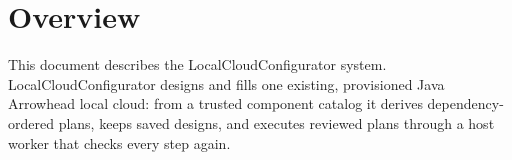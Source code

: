 \documentclass[a4paper]{arrowhead}
\begin{document}
\sloppy

\ArrowheadSetup

\begin{center}
  \vspace*{1cm}
  \huge{\arrowtitle}

  \vspace*{0.2cm}
  \LARGE{\arrowtype}
  \vspace*{1cm}

  \vspace*{\fill}


  \vspace*{1cm}
  \vspace*{\fill}

  \begin{abstract}
    This document describes the LocalCloudConfigurator support system of the Eclipse Arrowhead 5.2.2 framework, as implemented in \texttt{ah5-LocalCloudConfigurator-java} of the primary Java source tree (\texttt{Eclipse-Arrowhead-java}, Java-Spring with the vendored Eclipse Arrowhead common library) and deployed with the standalone Compose definition of that folder.
  \end{abstract}

  \vspace*{1cm}
\end{center}

\newpage

\tableofcontents
\newpage

\section{Overview}
\label{sec:overview}

This document describes the LocalCloudConfigurator system. LocalCloudConfigurator designs and fills one existing, provisioned Java Arrowhead local cloud: from a trusted component catalog it derives dependency-ordered plans, keeps saved designs, and executes reviewed plans through a host worker that checks every step again.
\end{document}
